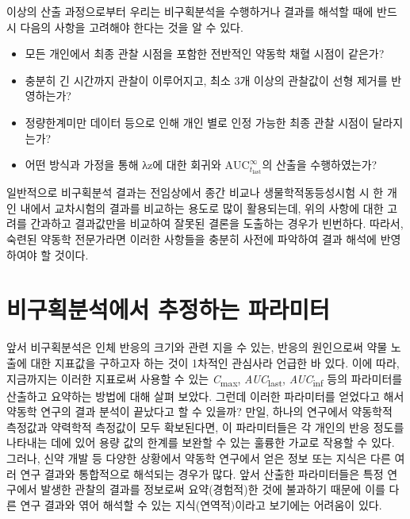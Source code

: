 \documentclass[
  11pt,
  krantz2, a4paper, twoside]{krantz}
\providecommand{\tightlist}{%
  \setlength{\itemsep}{0pt}\setlength{\parskip}{0pt}}
\begin{document}
이상의 산출 과정으로부터 우리는 비구획분석을 수행하거나 결과를 해석할 때에 반드시 다음의 사항을 고려해야 한다는 것을 알 수 있다.

\begin{itemize}
\tightlist
\item
  모든 개인에서 최종 관찰 시점을 포함한 전반적인 약동학 채혈 시점이 같은가?
\item
  충분히 긴 시간까지 관찰이 이루어지고, 최소 3개 이상의 관찰값이 선형 제거를 반영하는가?
\item
  정량한계미만 데이터 등으로 인해 개인 별로 인정 가능한 최종 관찰 시점이 달라지는가?
\item
  어떤 방식과 가정을 통해 λz에 대한 회귀와 \(\text{AUC}_{t_{\text{last}}}^{\infty}\)의 산출을 수행하였는가?
\end{itemize}

일반적으로 비구획분석 결과는 전임상에서 종간 비교나 생물학적동등성시험 시 한 개인 내에서 교차시험의 결과를 비교하는 용도로 많이 활용되는데, 위의 사항에 대한 고려를 간과하고 결과값만을 비교하여 잘못된 결론을 도출하는 경우가 빈번하다. 따라서, 숙련된 약동학 전문가라면 이러한 사항들을 충분히 사전에 파악하여 결과 해석에 반영하여야 할 것이다.

\hypertarget{uxbe44uxad6cuxd68duxbd84uxc11duxc5d0uxc11c-uxcd94uxc815uxd558uxb294-uxd30cuxb77cuxbbf8uxd130}{%
\section{비구획분석에서 추정하는 파라미터}\label{uxbe44uxad6cuxd68duxbd84uxc11duxc5d0uxc11c-uxcd94uxc815uxd558uxb294-uxd30cuxb77cuxbbf8uxd130}}

앞서 비구획분석은 인체 반응의 크기와 관련 지을 수 있는, 반응의 원인으로써 약물 노출에 대한 지표값을 구하고자 하는 것이 1차적인 관심사라 언급한 바 있다. 이에 따라, 지금까지는 이러한 지표로써 사용할 수 있는 \emph{C}\textsubscript{max}, \emph{AUC}\textsubscript{last}, \emph{AUC}\textsubscript{inf} 등의 파라미터를 산출하고 요약하는 방법에 대해 살펴 보았다. 그런데 이러한 파라미터를 얻었다고 해서 약동학 연구의 결과 분석이 끝났다고 할 수 있을까? 만일, 하나의 연구에서 약동학적 측정값과 약력학적 측정값이 모두 확보된다면, 이 파라미터들은 각 개인의 반응 정도를 나타내는 데에 있어 용량 값의 한계를 보완할 수 있는 훌륭한 가교로 작용할 수 있다. 그러나, 신약 개발 등 다양한 상황에서 약동학 연구에서 얻은 정보 또는 지식은 다른 여러 연구 결과와 통합적으로 해석되는 경우가 많다. 앞서 산출한 파라미터들은 특정 연구에서 발생한 관찰의 결과를 정보로써 요약(경험적)한 것에 불과하기 때문에 이를 다른 연구 결과와 엮어 해석할 수 있는 지식(연역적)이라고 보기에는 어려움이 있다.
\end{document}

